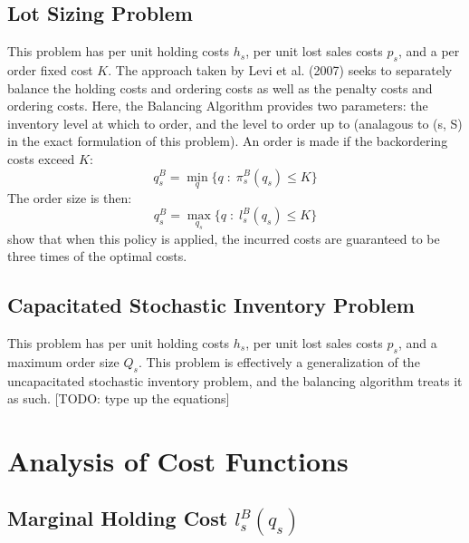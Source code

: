 \documentclass[12pt]{article}
\begin{document}
\subsection{Lot Sizing Problem}

This problem has per unit holding costs $h_s$, per unit lost sales costs $p_s$, and a per order fixed cost $K$. The approach taken by Levi et al. (2007) seeks to separately balance the holding costs and ordering costs as well as the penalty costs and ordering costs. Here, the Balancing Algorithm provides two parameters: the inventory level at which to order, and the level to order up to (analagous to (s, S) in the exact formulation of this problem). An order is made if the backordering costs exceed $K$:
$$
	q_s^B = \min_{q} \{q \; : \; \pi_s^B(q_s) \leq K\} 
$$
The order size is then:
$$
	q_s^B = \max_{q_s} \{q \; : \; l_s^B(q_s) \leq K\} 
$$
\cite{levi:2007} show that when this policy is applied, the incurred costs are guaranteed to be three times of the optimal costs.  

\subsection{Capacitated Stochastic Inventory Problem}

This problem has per unit holding costs $h_s$, per unit lost sales costs $p_s$, and a maximum order size $Q_s$. This problem is effectively a generalization of the uncapacitated stochastic inventory problem, and the balancing algorithm treats it as such. 
[TODO: type up the equations]

\section{Analysis of Cost Functions}

\subsection{Marginal Holding Cost $l_s^B(q_s)$}
\end{document}
